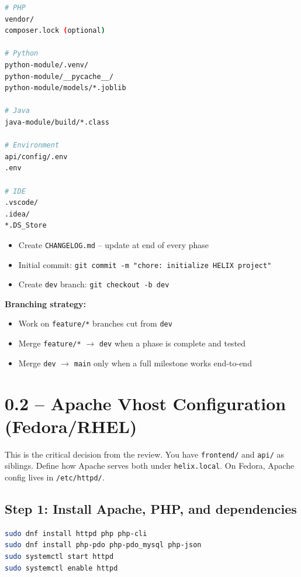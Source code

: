 \documentclass[11pt,a4paper]{report}
\newcommand{\todo}{\textcolor{helixamber}{\textbf{[ ]}}}
\newcommand{\filepath}[1]{\texttt{\small#1}}
\begin{document}
\begin{lstlisting}[language=bash]
# PHP
vendor/
composer.lock (optional)

# Python
python-module/.venv/
python-module/__pycache__/
python-module/models/*.joblib

# Java
java-module/build/*.class

# Environment
api/config/.env
.env

# IDE
.vscode/
.idea/
*.DS_Store
\end{lstlisting}

\begin{itemize}
    \item[\todo] Create \filepath{CHANGELOG.md} -- update at end of every phase
    \item[\todo] Initial commit: \texttt{git commit -m "chore: initialize HELIX project"}
    \item[\todo] Create \texttt{dev} branch: \texttt{git checkout -b dev}
\end{itemize}

\textbf{Branching strategy:}
\begin{itemize}
    \item Work on \texttt{feature/*} branches cut from \texttt{dev}
    \item Merge \texttt{feature/*} $\rightarrow$ \texttt{dev} when a phase is complete and tested
    \item Merge \texttt{dev} $\rightarrow$ \texttt{main} only when a full milestone works end-to-end
\end{itemize}

\section{0.2 -- Apache Vhost Configuration (Fedora/RHEL)}

This is the critical decision from the review. You have \filepath{frontend/} and \filepath{api/} as siblings. Define how Apache serves both under \texttt{helix.local}. On Fedora, Apache config lives in \filepath{/etc/httpd/}.

\subsection*{Step 1: Install Apache, PHP, and dependencies}

\begin{lstlisting}[language=bash]
sudo dnf install httpd php php-cli
sudo dnf install php-pdo php-pdo_mysql php-json
sudo systemctl start httpd
sudo systemctl enable httpd
\end{lstlisting}
\end{document}
